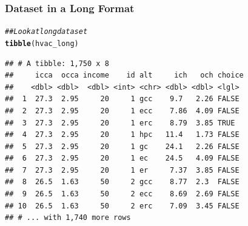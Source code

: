 \documentclass{beamer}\usepackage[]{graphicx}\usepackage[]{color}
\makeatletter
\newcommand{\hlnum}[1]{\textcolor[rgb]{0.686,0.059,0.569}{#1}}%
\newcommand{\hlcom}[1]{\textcolor[rgb]{0.678,0.584,0.686}{\textit{#1}}}%
\newcommand{\hlopt}[1]{\textcolor[rgb]{0,0,0}{#1}}%
\newcommand{\hlstd}[1]{\textcolor[rgb]{0.345,0.345,0.345}{#1}}%
\newcommand{\hlkwb}[1]{\textcolor[rgb]{0.69,0.353,0.396}{#1}}%
\newcommand{\hlkwc}[1]{\textcolor[rgb]{0.333,0.667,0.333}{#1}}%
\newcommand{\hlkwd}[1]{\textcolor[rgb]{0.737,0.353,0.396}{\textbf{#1}}}%
\newenvironment{kframe}{%
 \def\at@end@of@kframe{}%
 \ifinner\ifhmode%
  \def\at@end@of@kframe{\end{minipage}}%
  \begin{minipage}{\columnwidth}%
 \fi\fi%
 \def\FrameCommand##1{\hskip\@totalleftmargin \hskip-\fboxsep
 \colorbox{shadecolor}{##1}\hskip-\fboxsep
     \hskip-\linewidth \hskip-\@totalleftmargin \hskip\columnwidth}%
 \MakeFramed {\advance\hsize-\width
   \@totalleftmargin\z@ \linewidth\hsize
   \@setminipage}}%
 {\par\unskip\endMakeFramed%
 \at@end@of@kframe}
\newenvironment{knitrout}{}{} %
\makeatother
\begin{document}
\begin{frame}[fragile]\frametitle{Dataset in a Long Format}
\begin{knitrout}\footnotesize
{}\color{fgcolor}\begin{kframe}
\begin{alltt}
\hlcom{## Look at long dataset}
\hlkwd{tibble}\hlstd{(hvac_long)}
\end{alltt}
\begin{verbatim}
## # A tibble: 1,750 x 8
##     icca  occa income    id alt     ich   och choice
##    <dbl> <dbl>  <dbl> <int> <chr> <dbl> <dbl> <lgl> 
##  1  27.3  2.95     20     1 gcc    9.7   2.26 FALSE 
##  2  27.3  2.95     20     1 ecc    7.86  4.09 FALSE 
##  3  27.3  2.95     20     1 erc    8.79  3.85 TRUE  
##  4  27.3  2.95     20     1 hpc   11.4   1.73 FALSE 
##  5  27.3  2.95     20     1 gc    24.1   2.26 FALSE 
##  6  27.3  2.95     20     1 ec    24.5   4.09 FALSE 
##  7  27.3  2.95     20     1 er     7.37  3.85 FALSE 
##  8  26.5  1.63     50     2 gcc    8.77  2.3  FALSE 
##  9  26.5  1.63     50     2 ecc    8.69  2.69 FALSE 
## 10  26.5  1.63     50     2 erc    7.09  3.45 FALSE 
## # ... with 1,740 more rows
\end{verbatim}
\end{kframe}
\end{knitrout}
\end{frame}

\end{document}
